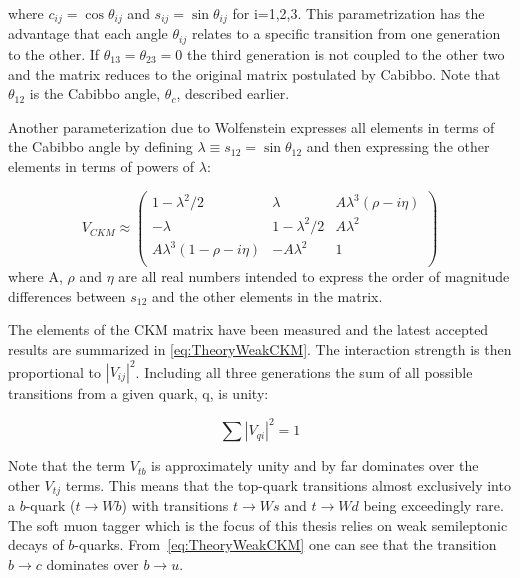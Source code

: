 where $c_{ij}=\cos\theta_{ij}$ and $s_{ij}=\sin\theta_{ij}$ for i=1,2,3. This parametrization has the advantage that each angle $\theta_{ij}$ relates to a specific transition from one generation to the other. If $\theta_{13} = \theta_{23} = 0$ the third generation is not coupled to the other two and the matrix reduces to the original matrix postulated by Cabibbo. Note that $\theta_{12}$ is the Cabibbo angle, $\theta_c$, described earlier.

Another parameterization due to Wolfenstein \cite{Theory:CKMWolfenstein} expresses all elements in terms of the Cabibbo angle by defining $\lambda\equiv s_{12}=\sin \theta_{12}$ and then expressing the other elements in terms of powers of $\lambda$:

\begin{equation}
\label{eq:TheoryWeakCKMWolfenstein}
V_{CKM}
\approx
\begin{pmatrix}
1-\lambda^2/2 & \lambda & A\lambda^3(\rho-i\eta) \\
-\lambda & 1-\lambda^2/2 & A\lambda^2 \\ 
A\lambda^3(1-\rho-i\eta) & -A\lambda^2 & 1\\
\end{pmatrix}
\end{equation}
%
where A, $\rho$ and $\eta$ are all real numbers intended to express the order of magnitude differences between $s_{12}$ and the other elements in the matrix.

The elements of the CKM matrix have been measured and the latest accepted results are summarized in \ref{eq:TheoryWeakCKM}\cite{Theory:PDGBooklet}. The interaction strength is then proportional to $|V_{ij}|^{2}$. Including all three generations the sum of all possible transitions from a given quark, q, is unity:

\begin{equation} 
\label{eq:TheoryWeakMixingTotal}
\sum|V_{qi}|^{2}=1
\end{equation}

Note that the term $V_{tb}$ is approximately unity and by far dominates over the other $V_{tj}$ terms. This means that the top-quark transitions almost exclusively into a $b$-quark ($t\rightarrow Wb$) with transitions $t\rightarrow Ws$ and $t\rightarrow Wd$ being exceedingly rare. The soft muon tagger which is the focus of this thesis relies on weak semileptonic decays of $b$-quarks. From~\ref{eq:TheoryWeakCKM} one can see that the transition $b\rightarrow c$ dominates over $b\rightarrow u$.


